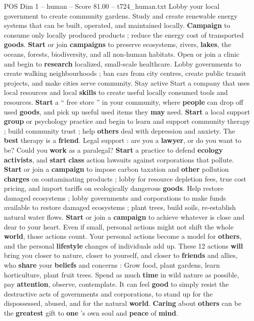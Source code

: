 \begin{textsample}{POS Dim 1 – human – Score 81.00 – t724\_human.txt}
Lobby your local government to create community gardens.
Study and create renewable energy systems that can be built, operated, and maintained locally. \textbf{Campaign} to consume only locally produced products ; reduce the energy cost of transported \textbf{goods}. \textbf{Start} or join \textbf{campaigns} to preserve ecosystems, rivers, \textbf{lakes}, the oceans, forests, biodiversity, and all non-human habitats.
Open or join a clinic and begin to \textbf{research} localized, small-scale healthcare.
Lobby governments to create walking neighbourhoods ; ban cars from city centres, create public transit projects, and make cities serve community.
Stay active Start a company that uses local resources and local \textbf{skills} to create useful locally consumed tools and resources. \textbf{Start} a “ free store ” in your community, where \textbf{people} can drop off used \textbf{goods}, and pick up useful used items they \textbf{may} need. \textbf{Start} a local support \textbf{group} or psychology practice and begin to learn and support community therapy ; build community trust ; help \textbf{others} deal with depression and anxiety.
The \textbf{best} therapy is a \textbf{friend}.
Legal support : are you a \textbf{lawyer}, or do you want to be?
Could you \textbf{work} as a paralegal? \textbf{Start} a practice to defend \textbf{ecology} \textbf{activists}, and \textbf{start} \textbf{class} action lawsuits against corporations that pollute. \textbf{Start} or join a \textbf{campaign} to impose carbon taxation and \textbf{other} pollution \textbf{charges} on contaminating products ; lobby for resource depletion fees, true cost pricing, and import tariffs on ecologically dangerous \textbf{goods}.
Help restore damaged ecosystems ; lobby governments and corporations to make funds available to restore damaged ecosystems ; plant trees, build soils, re-establish natural water flows. \textbf{Start} or join a \textbf{campaign} to achieve whatever is close and dear to your heart.
Even if small, personal actions might not shift the whole \textbf{world}, those actions count.
Your personal actions become a model for \textbf{others}, and the personal \textbf{lifestyle} changes of individuals add up.
These 12 actions \textbf{will} bring you closer to nature, closer to yourself, and closer to \textbf{friends} and allies, who \textbf{share} your \textbf{beliefs} and concerns : Grow food, plant gardens, learn horticulture, plant fruit trees.
Spend as much \textbf{time} in wild nature as possible, pay \textbf{attention}, observe, contemplate.
It can feel \textbf{good} to simply resist the destructive acts of governments and corporations, to stand up for the dispossessed, abused, and for the natural \textbf{world}. \textbf{Caring} about \textbf{others} can be the \textbf{greatest} gift to \textbf{one} ’s own soul and \textbf{peace} of \textbf{mind}.

\end{textsample}
